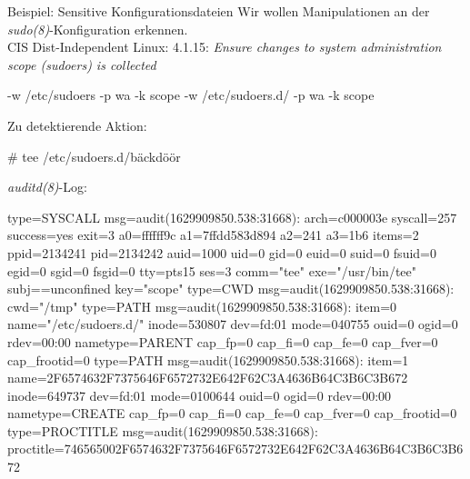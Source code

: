 \documentclass[xcolor={dvipsnames},aspectratio=169]{beamer}
\begin{document}
\begin{frame}[fragile]{Beispiel: Sensitive Konfigurationsdateien}
  Wir wollen Manipulationen an der \emph{sudo(8)}-Konfiguration erkennen.\\
  {\tiny\vspace{2ex}{}CIS Dist-Independent Linux: 4.1.15: \emph{Ensure changes to system administration scope (sudoers) is collected}}
{\small
\begin{semiverbatim}
-w /etc/sudoers -p wa -k {\color{violet}scope}
-w /etc/sudoers.d/ -p wa -k {\color{violet}scope}
\end{semiverbatim}
}
Zu detektierende Aktion:
{\small
\begin{semiverbatim}
# {\color{orange}tee} {\color{red}/etc/sudoers.d/bäckdöör}
\end{semiverbatim}
}
\emph{auditd(8)}-Log:
\tiny
\begin{semiverbatim}
type=SYSCALL msg=audit(1629909850.538:31668): arch={\color{blue}c000003e} syscall={\color{blue}257} success=yes exit=3 a0={\color{blue}ffffff9c} a1={\color{blue}7ffdd583d894} a2={\color{blue}241}
  a3={\color{blue}1b6} items=2 ppid={\color{PineGreen}2134241} pid={\color{PineGreen}2134242} auid={\color{blue}1000} uid=0 gid=0 euid=0 suid=0 fsuid=0 egid=0 sgid=0 fsgid=0 tty=pts15 ses=3
  comm="{}{\color{orange}tee}" exe="{}/usr/bin/{\color{orange}tee}" subj==unconfined key="{}{\color{violet}scope}"
type=CWD msg=audit(1629909850.538:31668): cwd="/tmp"
type=PATH msg=audit(1629909850.538:31668): item=0 name="{}{\color{red}/etc/sudoers.d/}" inode=530807 dev={\color{blue}fd:01} mode={\color{blue}040755} ouid=0 ogid=0 
  rdev={\color{blue}00:00} nametype=PARENT cap_fp=0 cap_fi=0 cap_fe=0 cap_fver=0 cap_frootid=0
type=PATH msg=audit(1629909850.538:31668): item=1 name={\color{red}2F6574632F7375646F6572732E642F62C3A4636B64C3B6C3B672} inode=649737
  dev={\color{blue}fd:01} mode={\color{blue}0100644} ouid=0 ogid=0 rdev={\color{blue}00:00} nametype=CREATE cap_fp=0 cap_fi=0 cap_fe=0 cap_fver=0 cap_frootid=0
type=PROCTITLE msg=audit(1629909850.538:31668): proctitle={\color{orange}746565}00{\color{red}2F6574632F7375646F6572732E642F62C3A4636B64C3B6C3B672}
\end{semiverbatim}
\end{frame}
\end{document}
